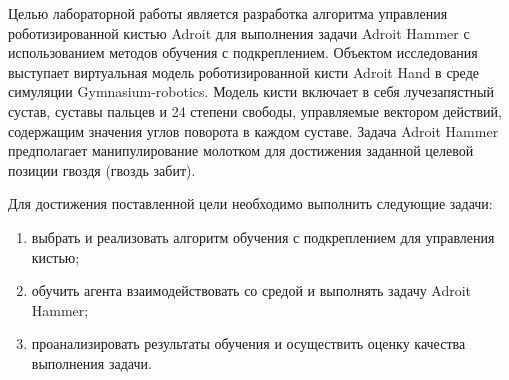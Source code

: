
Целью лабораторной работы является разработка алгоритма управления роботизированной кистью Adroit 
для выполнения задачи Adroit Hammer с использованием методов обучения с подкреплением. 
Объектом исследования выступает виртуальная модель роботизированной кисти Adroit Hand в среде симуляции Gymnasium-robotics. Модель кисти включает в
себя лучезапястный сустав, суставы пальцев и 24 степени свободы, управляемые вектором действий, содержащим значения углов поворота в каждом суставе.
Задача Adroit Hammer предполагает манипулирование молотком для достижения заданной целевой позиции гвоздя (гвоздь забит).

Для достижения поставленной цели необходимо выполнить следующие задачи:
\begin{enumerate}
    \item выбрать и реализовать алгоритм обучения с подкреплением для управления кистью;
    \item обучить агента взаимодействовать со средой и выполнять задачу Adroit Hammer;
    \item проанализировать результаты обучения и осуществить оценку качества выполнения задачи.
\end{enumerate}

\clearpage
